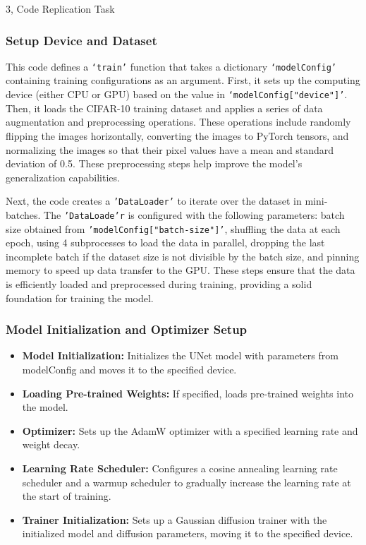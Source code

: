 \documentclass[10pt,a4paper]{article}
\begin{document}
\begin{task}{3, Code Replication Task}
\subsubsection{Setup Device and Dataset}

This code defines a \texttt{‘train’} function that takes a dictionary \texttt{‘modelConfig’} containing training configurations as an argument. First, it sets up the computing device (either CPU or GPU) based on the value in \texttt{‘modelConfig["device"]’}. Then, it loads the CIFAR-10 training dataset and applies a series of data augmentation and preprocessing operations. These operations include randomly flipping the images horizontally, converting the images to PyTorch tensors, and normalizing the images so that their pixel values have a mean and standard deviation of 0.5. These preprocessing steps help improve the model's generalization capabilities.

Next, the code creates a \texttt{'DataLoader'} to iterate over the dataset in mini-batches. The \texttt{'DataLoade'r} is configured with the following parameters: batch size obtained from \texttt{'modelConfig["batch-size"]'}, shuffling the data at each epoch, using 4 subprocesses to load the data in parallel, dropping the last incomplete batch if the dataset size is not divisible by the batch size, and pinning memory to speed up data transfer to the GPU. These steps ensure that the data is efficiently loaded and preprocessed during training, providing a solid foundation for training the model.

\subsubsection{Model Initialization and Optimizer Setup}

\begin{itemize}
    \item \textbf{Model Initialization:} Initializes the UNet model with parameters from modelConfig and moves it to the specified device.
    \item \textbf{Loading Pre-trained Weights:} If specified, loads pre-trained weights into the model.
    \item \textbf{Optimizer:} Sets up the AdamW optimizer with a specified learning rate and weight decay.
    \item \textbf{Learning Rate Scheduler:} Configures a cosine annealing learning rate scheduler and a warmup scheduler to gradually increase the learning rate at the start of training.
    \item \textbf{Trainer Initialization:} Sets up a Gaussian diffusion trainer with the initialized model and diffusion parameters, moving it to the specified device.
\end{itemize}
   


\end{task}
\end{document}
